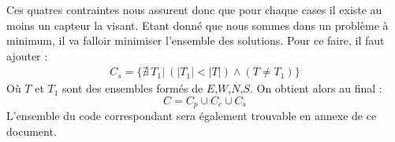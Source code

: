 \documentclass[a4paper]{article}
\begin{document}
Ces quatres contraintes nous assurent donc que pour chaque cases il existe au moins un capteur la visant. Etant donné que nous sommes dans un problème à minimum, il va falloir minimiser l'ensemble des solutions. Pour ce faire, il faut ajouter : 
\begin{align*}
C_s = \{ \nexists \ T_1 | \ (| T_1 | <  | T | ) \wedge (T \neq T_1) \}
\end{align*}
Où $T$ et $T_1$ sont des ensembles formés de $E$,$W$,$N$,$S$. On obtient alors au final : 
\begin{equation*}
C = C_p \cup C_c \cup C_s
\end{equation*}
L'ensemble du code correspondant sera également trouvable en annexe de ce document.
\end{document}
